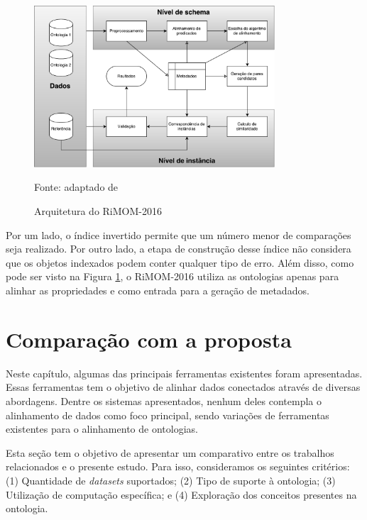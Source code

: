 \begin{figure}[!ht]
	\centering
	\includegraphics[width=0.8\textwidth]{./imagens/rimom_2016.pdf}
    \caption{Arquitetura do RiMOM-2016}
	\footnotesize{Fonte: adaptado de \cite{zhang2016rimom}}
	\label{fig:rimom}
\end{figure}

Por um lado, o índice invertido permite que um número menor de comparações seja realizado. Por outro lado, a etapa de construção desse índice não considera que os objetos indexados podem conter qualquer tipo de erro. Além disso, como pode ser visto na Figura \ref{fig:rimom}, o RiMOM-2016 utiliza as ontologias apenas para alinhar as propriedades e como entrada para a geração de metadados.

\section{Comparação com a proposta}

Neste capítulo, algumas das principais ferramentas existentes foram apresentadas. Essas ferramentas tem o objetivo de alinhar dados conectados através de diversas abordagens. Dentre os sistemas apresentados, nenhum deles contempla o alinhamento de dados como foco principal, sendo variações de ferramentas existentes para o alinhamento de ontologias.

Esta seção tem o objetivo de apresentar um comparativo entre os trabalhos relacionados e o presente estudo. Para isso, consideramos os seguintes critérios: (1) Quantidade de \textit{datasets} suportados; (2) Tipo de suporte à ontologia; (3) Utilização de computação específica; e (4) Exploração dos conceitos presentes na ontologia.

